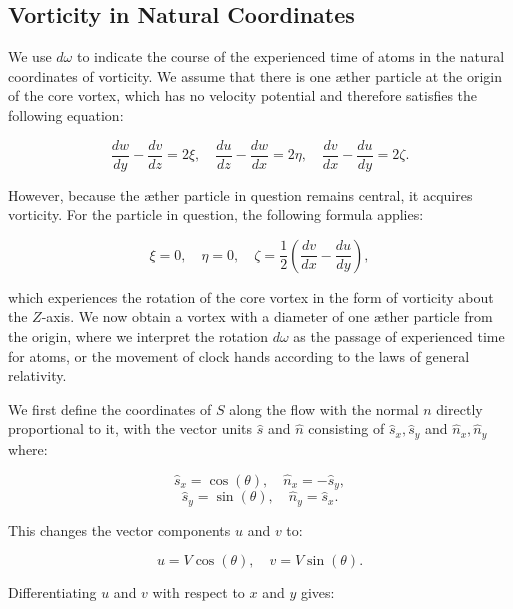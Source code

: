 
\subsection{Vorticity in Natural Coordinates}


We use $d\omega$ to indicate the course of the experienced time of atoms in the natural coordinates of vorticity. We assume that there is one \ae ther particle at the origin of the core vortex, which has no velocity potential and therefore satisfies the following equation:


\begin{equation}
\frac{d w}{d y}-\frac{d v}{d z}=2 \xi, \quad \frac{d u}{d z}-\frac{d w}{d x}=2 \eta, \quad \frac{d v}{d x}-\frac{d u}{d y}=2 \zeta.
\end{equation}


However, because the \ae ther particle in question remains central, it acquires vorticity. For the particle in question, the following formula applies:


\begin{equation}
\xi=0, \quad \eta=0, \quad \zeta=\frac{1}{2}\left(\frac{d v}{d x}-\frac{d u}{d y}\right),
\end{equation}


which experiences the rotation of the core vortex in the form of vorticity about the $Z$-axis. We now obtain a vortex with a diameter of one \ae ther particle from the origin, where we interpret the rotation $d\omega$ as the passage of experienced time for atoms, or the movement of clock hands according to the laws of general relativity.


We first define the coordinates of $S$ along the flow with the normal $n$ directly proportional to it, with the vector units $\hat{s}$ and $\hat{n}$ consisting of $\hat{s}_x, \hat{s}_y$ and $\hat{n}_x, \hat{n}_y$ where:


\begin{equation}
\hat{s}_x=\cos (\theta), \quad \hat{n}_x=-\hat{s}_y,
\end{equation}
\begin{equation}
\hat{s}_y=\sin (\theta), \quad \hat{n}_y=\hat{s}_x.
\end{equation}


This changes the vector components $u$ and $v$ to:


\begin{equation}
u=V \cos (\theta), \quad v=V \sin (\theta).
\end{equation}


Differentiating $u$ and $v$ with respect to $x$ and $y$ gives:


